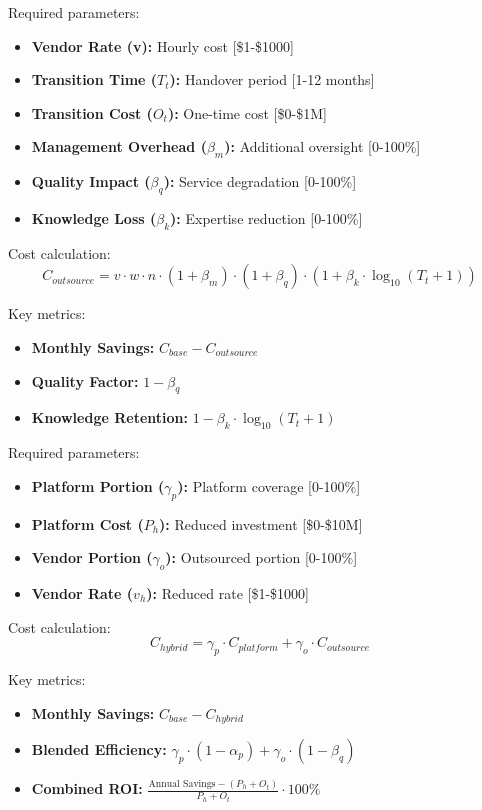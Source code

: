 \documentclass[12pt,a4paper]{article}
\newenvironment{definition}[1]
{\begin{mdframed}[style=definitionstyle,frametitle={Definition: #1}]}
{\end{mdframed}}
\begin{document}
\begin{definition}{Team Outsourcing Solution Inputs}
Required parameters:
\begin{itemize}
    \item \textbf{Vendor Rate (v):} Hourly cost [\$1-\$1000]
    \item \textbf{Transition Time ($T_t$):} Handover period [1-12 months]
    \item \textbf{Transition Cost ($O_t$):} One-time cost [\$0-\$1M]
    \item \textbf{Management Overhead ($\beta_m$):} Additional oversight [0-100\%]
    \item \textbf{Quality Impact ($\beta_q$):} Service degradation [0-100\%]
    \item \textbf{Knowledge Loss ($\beta_k$):} Expertise reduction [0-100\%]
\end{itemize}

Cost calculation:
\begin{equation}
    C_{outsource} = v \cdot w \cdot n \cdot (1 + \beta_m) \cdot (1 + \beta_q) \cdot (1 + \beta_k \cdot \log_{10}(T_t + 1))
\end{equation}

Key metrics:
\begin{itemize}
    \item \textbf{Monthly Savings:} $C_{base} - C_{outsource}$
    \item \textbf{Quality Factor:} $1 - \beta_q$
    \item \textbf{Knowledge Retention:} $1 - \beta_k \cdot \log_{10}(T_t + 1)$
\end{itemize}
\end{definition}

\begin{definition}{Team Hybrid Solution Inputs}
Required parameters:
\begin{itemize}
    \item \textbf{Platform Portion ($\gamma_p$):} Platform coverage [0-100\%]
    \item \textbf{Platform Cost ($P_h$):} Reduced investment [\$0-\$10M]
    \item \textbf{Vendor Portion ($\gamma_o$):} Outsourced portion [0-100\%]
    \item \textbf{Vendor Rate ($v_h$):} Reduced rate [\$1-\$1000]
\end{itemize}

Cost calculation:
\begin{equation}
    C_{hybrid} = \gamma_p \cdot C_{platform} + \gamma_o \cdot C_{outsource}
\end{equation}

Key metrics:
\begin{itemize}
    \item \textbf{Monthly Savings:} $C_{base} - C_{hybrid}$
    \item \textbf{Blended Efficiency:} $\gamma_p \cdot (1 - \alpha_p) + \gamma_o \cdot (1 - \beta_q)$
    \item \textbf{Combined ROI:} $\frac{\text{Annual Savings} - (P_h + O_t)}{P_h + O_t} \cdot 100\%$
\end{itemize}
\end{definition}
\end{document}
